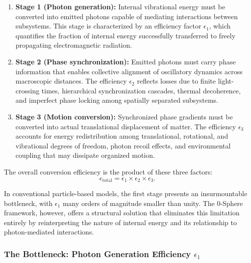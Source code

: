 \documentclass[12pt,letterpaper]{article}
\begin{document}
\begin{enumerate}
\item \textbf{Stage 1 (Photon generation):} Internal vibrational energy must be converted into emitted photons capable of mediating interactions between subsystems. This stage is characterized by an efficiency factor $\epsilon_1$, which quantifies the fraction of internal energy successfully transferred to freely propagating electromagnetic radiation.

\item \textbf{Stage 2 (Phase synchronization):} Emitted photons must carry phase information that enables collective alignment of oscillatory dynamics across macroscopic distances. The efficiency $\epsilon_2$ reflects losses due to finite light-crossing times, hierarchical synchronization cascades, thermal decoherence, and imperfect phase locking among spatially separated subsystems.

\item \textbf{Stage 3 (Motion conversion):} Synchronized phase gradients must be converted into actual translational displacement of matter. The efficiency $\epsilon_3$ accounts for energy redistribution among translational, rotational, and vibrational degrees of freedom, photon recoil effects, and environmental coupling that may dissipate organized motion.
\end{enumerate}

The overall conversion efficiency is the product of these three factors:
\begin{equation}
\epsilon_{\text{total}} = \epsilon_1 \times \epsilon_2 \times \epsilon_3.
\end{equation}

In conventional particle-based models, the first stage presents an insurmountable bottleneck, with $\epsilon_1$ many orders of magnitude smaller than unity. The 0-Sphere framework, however, offers a structural solution that eliminates this limitation entirely by reinterpreting the nature of internal energy and its relationship to photon-mediated interactions.


\subsubsection{The Bottleneck: Photon Generation Efficiency $\epsilon_1$}
\label{subsubsec:epsilon1_bottleneck}
\end{document}
